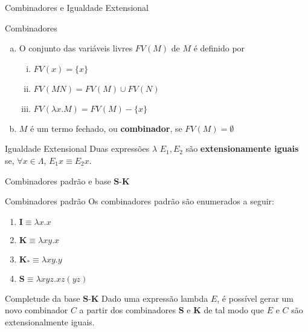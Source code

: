 \begin{frame}[fragile]{Combinadores e Igualdade Extensional}

    \begin{block}{Combinadores}
        \begin{enumerate}[(a)]
            \item O conjunto das variáveis livres $FV(M)$ de $M$ é definido por
            \begin{enumerate}[i.]
                \item $FV(x) = \lbrace x\rbrace$
                \item $FV(MN) = FV(M)\cup FV(N)$
                \item $FV(\lambda x.M) = FV(M) - \lbrace x\rbrace$
            \end{enumerate}

            \item $M$ é um termo fechado, ou \textbf{combinador}, se $FV(M) = \emptyset$
        \end{enumerate}
    \end{block}

    \vspace{0.1in}

    \begin{block}{Igualdade Extensional}
        Duas expressões $\lambda$ $E_1, E_2$ são \textbf{extensionamente iguais} se, 
        $\forall x\in\Lambda$, $E_1x \equiv E_2x$.
    \end{block}

\end{frame}

\begin{frame}[fragile]{Combinadores padrão e base $\mathbf{S}$-$\mathbf{K}$}

    \begin{block}{Combinadores padrão}
        Os combinadores padrão são enumerados a seguir: 
        \begin{enumerate}
            \item $\mathbf{I} \equiv \lambda x.x$ 
            \item $\mathbf{K} \equiv \lambda xy.x$ 
            \item $\mathbf{K_*} \equiv \lambda xy.y$ 
            \item $\mathbf{S} \equiv \lambda xyz.xz(yz)$
        \end{enumerate}
    \end{block}

    \vspace{0.1in}

    \begin{block}{Completude da base $\mathbf{S}$-$\mathbf{K}$}
        Dado uma expressão lambda $E$, é possível gerar um novo combinador $C$ a partir dos
        combinadores $\mathbf{S}$ e $\mathbf{K}$ de tal modo que $E$ e $C$ são
        extensionalmente iguais.
    \end{block}

\end{frame}

